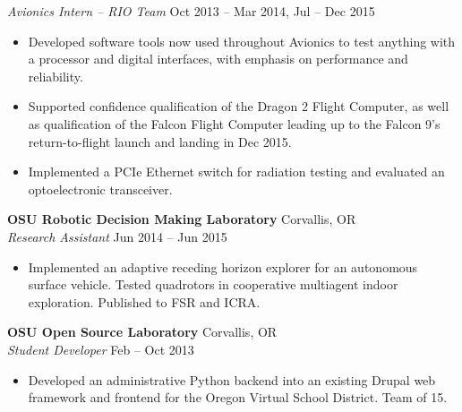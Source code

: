 \documentclass[10pt,letterpaper,margin]{res}
\newcommand{\org}[2]{{\bf #1} \hfill {\color{lightgray} #2} \\}
\newcommand{\pos}[2]{\small {\it #1} \hfill {\color{lightgray} #2} \vspace{0.0em}}
\begin{document}
\begin{resume}
\pos {Avionics Intern -- RIO Team} {Oct 2013 -- Mar 2014, Jul -- Dec 2015}

\begin{itemize}
  \item Developed software tools now used throughout Avionics to test anything
    with a processor and digital interfaces, with emphasis on performance and
    reliability.
  \item Supported confidence qualification of the Dragon 2 Flight Computer, as
    well as qualification of the Falcon Flight Computer leading up to the
    Falcon 9's return-to-flight launch and landing in Dec 2015.
  \item Implemented a PCIe Ethernet switch for radiation testing and evaluated
    an optoelectronic transceiver.
\end{itemize}


\org {OSU Robotic Decision Making Laboratory} {Corvallis, OR}
\pos {Research Assistant} {Jun 2014 -- Jun 2015}

\begin{itemize}
  \item Implemented an adaptive receding horizon explorer for an autonomous
    surface vehicle. Tested quadrotors in cooperative multiagent indoor
    exploration. Published to FSR and ICRA.
\end{itemize}


%


\org {OSU Open Source Laboratory} {Corvallis, OR}
\pos {Student Developer} {Feb -- Oct 2013}

\begin{itemize}
  \item Developed an administrative Python backend into an existing Drupal web
    framework and frontend for the Oregon Virtual School District. Team of 15.
\end{itemize}



\end{resume}
\end{document}
